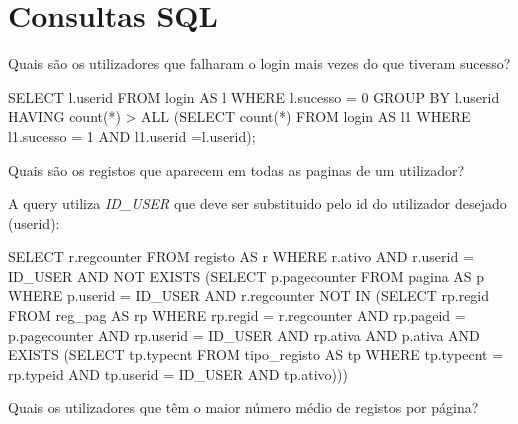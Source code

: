 \documentclass[11pt,a4paper]{article}
\begin{document}
\section{Consultas SQL}
\begin{enumerate}[label=(\alph*)]
\begin{minipage}{\textwidth}
	\item Quais são os utilizadores que falharam o login mais vezes do que tiveram sucesso?
	
		\begin{code}[language=SQL]
SELECT l.userid
FROM login AS l
WHERE l.sucesso = 0
GROUP BY l.userid
HAVING count(*) > ALL
    (SELECT count(*)
     FROM login AS l1
     WHERE l1.sucesso = 1
         AND l1.userid =l.userid);
		\end{code}
\end{minipage}

\begin{minipage}{\textwidth}
	\item Quais são os registos que aparecem em todas as paginas de um utilizador?
	
	A query utiliza \textit{ID\_USER} que deve ser substituido pelo id do utilizador desejado (userid):
		\begin{code}[language=SQL]
SELECT r.regcounter
FROM registo AS r
WHERE r.ativo
    AND r.userid = ID_USER
    AND NOT EXISTS
        (SELECT p.pagecounter
         FROM pagina AS p
         WHERE p.userid = ID_USER
             AND r.regcounter NOT IN
                 (SELECT rp.regid
                  FROM reg_pag AS rp
                  WHERE rp.regid = r.regcounter
                      AND rp.pageid = p.pagecounter
                      AND rp.userid = ID_USER
                      AND rp.ativa
                      AND p.ativa
                      AND EXISTS
                          (SELECT tp.typecnt
                           FROM tipo_registo AS tp
                           WHERE tp.typecnt = rp.typeid
                               AND tp.userid = ID_USER
                               AND tp.ativo)))
        		\end{code}
\end{minipage}	

\begin{minipage}{\textwidth}
	\item Quais os utilizadores que têm o maior número médio de registos por página?
	

\end{minipage}
\end{enumerate}
\end{document}
